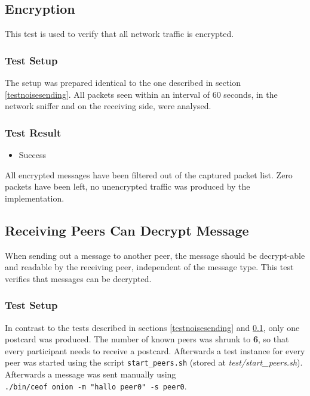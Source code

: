 \subsection{Encryption}
\label{testencryption}
This test is used to verify that all network traffic is encrypted.
\subsubsection{Test Setup}
The setup was prepared identical to the one described
in section \ref{testnoisesending}. All packets seen within
an interval of 60 seconds, in the network sniffer and on 
the receiving side, were analysed.
\subsubsection{Test Result}
\begin{itemize}
\item Success
\end{itemize}
All encrypted messages have been filtered out of the captured
packet list. Zero packets have been left, no unencrypted traffic
was produced by the implementation.
\subsection{Receiving Peers Can Decrypt Message}
When sending out a message to another peer, the message should
be decrypt-able and readable by the receiving peer, independent of the
message type. This test verifies that messages can be decrypted.
\subsubsection{Test Setup}
In contrast to the tests described in sections
\ref{testnoisesending} and \ref{testencryption}, only
one postcard was produced. The number of known peers was shrunk
to \textbf{6}, so that every participant needs to receive a postcard.
Afterwards a test instance for every peer was started using
the script \verb=start_peers.sh=
(stored at \textit{test/start\_peers.sh}).
Afterwards a message was sent manually using
\\ \verb=./bin/ceof onion -m "hallo peer0" -s peer0=.
